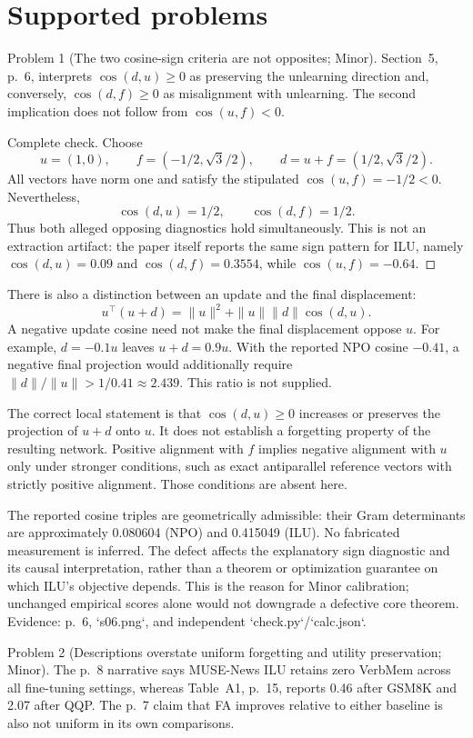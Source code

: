 \documentclass[10pt]{article}
\begin{document}
\section*{Supported problems}
Problem 1 (The two cosine-sign criteria are not opposites; Minor).  Section 5, p. 6, interprets \(\cos(d,u)\geq0\) as preserving the unlearning direction and, conversely, \(\cos(d,f)\geq0\) as misalignment with unlearning. The second implication does not follow from \(\cos(u,f)<0\).\par
Complete check. Choose \[u=(1,0),\qquad f=(-1/2,\sqrt3/2),\qquad
 d=u+f=(1/2,\sqrt3/2).\] All vectors have norm one and satisfy the stipulated \(\cos(u,f)=-1/2<0\). Nevertheless, \[\cos(d,u)=1/2,\qquad \cos(d,f)=1/2.\] Thus both alleged opposing diagnostics hold simultaneously. This is not an extraction artifact: the paper itself reports the same sign pattern for ILU, namely \(\cos(d,u)=0.09\) and \(\cos(d,f)=0.3554\), while \(\cos(u,f)=-0.64\). ◻\par
There is also a distinction between an update and the final displacement: \[u^\top(u+d)=\|u\|^2+\|u\|\|d\|\cos(d,u).\] A negative update cosine need not make the final displacement oppose \(u\). For example, \(d=-0.1u\) leaves \(u+d=0.9u\). With the reported NPO cosine \(-0.41\), a negative final projection would additionally require \(\|d\|/\|u\|>1/0.41\approx2.439\). This ratio is not supplied.\par
The correct local statement is that \(\cos(d,u)\geq0\) increases or preserves the projection of \(u+d\) onto \(u\). It does not establish a forgetting property of the resulting network. Positive alignment with \(f\) implies negative alignment with \(u\) only under stronger conditions, such as exact antiparallel reference vectors with strictly positive alignment. Those conditions are absent here.\par
The reported cosine triples are geometrically admissible: their Gram determinants are approximately 0.080604 (NPO) and 0.415049 (ILU). No fabricated measurement is inferred. The defect affects the explanatory sign diagnostic and its causal interpretation, rather than a theorem or optimization guarantee on which ILU’s objective depends. This is the reason for Minor calibration; unchanged empirical scores alone would not downgrade a defective core theorem. Evidence: p. 6, `s06.png`, and independent `check.py`/`calc.json`.\par
Problem 2 (Descriptions overstate uniform forgetting and utility preservation; Minor).  The p. 8 narrative says MUSE-News ILU retains zero VerbMem across all fine-tuning settings, whereas Table A1, p. 15, reports 0.46 after GSM8K and 2.07 after QQP. The p. 7 claim that FA improves relative to either baseline is also not uniform in its own comparisons.\par
\end{document}

